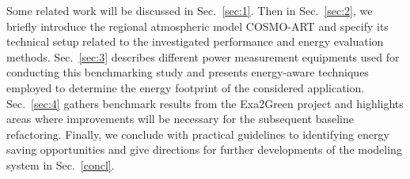 Some  related work  will  be discussed  in  Sec.~\ref{sec:1}. Then  in
Sec.~\ref{sec:2}, we briefly  introduce the regional atmospheric model
COSMO-ART \citep{Vogel-2009}  and specify its  technical setup related
to  the  investigated   performance  and  energy  evaluation  methods.
Sec.~\ref{sec:3} describes different power measurement equipments used
for  conducting  this  benchmarking  study and  presents  energy-aware
techniques  employed   to  determine  the  energy   footprint  of  the
considered  application.  Sec.~\ref{sec:4}  gathers  benchmark results
from  the Exa2Green  project and  highlights areas  where improvements
will be  necessary for the subsequent  baseline refactoring.  Finally,
we  conclude with  practical guidelines  to identifying  energy saving
opportunities  and give  directions  for further  developments of  the
modeling system in Sec.~\ref{concl}.
